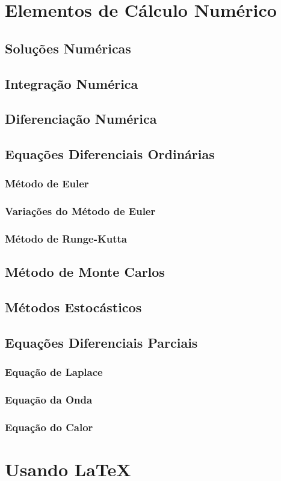 \documentclass[12pt,a4paper,titlepage,portuges,twoside,final]{book}
\begin{document}
\chapter{Elementos de Cálculo Numérico}
\section{Soluções Numéricas}
\section{Integração Numérica}
\section{Diferenciação Numérica}
\section{Equações Diferenciais Ordinárias}
\subsection{Método de Euler}
\subsection{Variações do Método de Euler}
\subsection{Método de Runge-Kutta}
\section{Método de Monte Carlos}\label{sc:Monte_Carlo}
\section{Métodos Estocásticos}



\section{Equações Diferenciais Parciais}
\subsection{Equação de Laplace}
\subsection{Equação da Onda}
\subsection{Equação do Calor}

\chapter{Usando \LaTeX}\label{a:latex}



\end{document}
